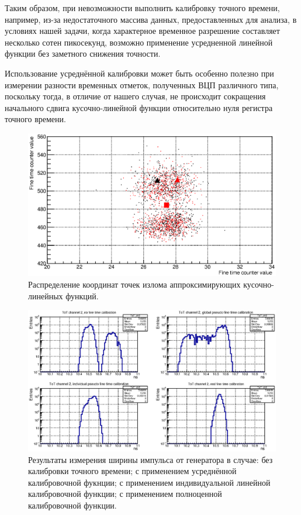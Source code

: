 Таким образом, при невозможности выполнить калибровку точного времени, например, из-за недостаточного массива данных, предоставленных для анализа, в условиях нашей задачи, когда характерное временное разрешение составляет несколько сотен пикосекунд, возможно применение усредненной линейной функции без заметного снижения точности.

Использование усреднённой калибровки может быть особенно полезно при измерении разности временных отметок, полученных ВЦП различного типа, поскольку тогда, в отличие от нашего случая, не происходит сокращения начального сдвига кусочно-линейной функции относительно нуля регистра точного времени.

\begin{figure}
\includegraphics[width=1.0\textwidth]{pictures/19_ABmap.eps}
\caption{Распределение координат точек излома аппроксимирующих кусочно-линейных функций.}
\label{fig:ABmap}
\end{figure}

\begin{figure}
\includegraphics[width=1.0\textwidth]{pictures/20_ToT_ch2.eps}
\caption{Результаты измерения ширины импульса от генератора в случае: без калибровки точного времени; с применением усреднённой калибровочной фукнции; с применением индивидуальной линейной калибровочной функции; с применением полноценной калибровочной функции.}
\label{fig:FourToT}
\end{figure}

